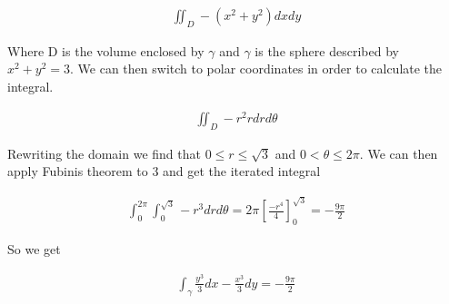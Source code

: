 \documentclass[a4paper]{article}
\begin{document}
\begin{align}
    \iint_{D} -(x^2 + y^2) dxdy
\end{align}

Where D is the volume enclosed by $\gamma$ and $\gamma$ is the sphere described by $x^2 + y^2 = 3$. We can then switch to polar coordinates in order to calculate the integral.

\begin{align}
    \iint_{D} -r^2 rdrd\theta
\end{align}

Rewriting the domain we find that $0\leq r \leq \sqrt{3}$ and $0 < \theta \leq 2\pi$. We can then apply Fubinis theorem to 3 and get the iterated integral

\begin{align}
    \int_{0}^{2\pi} \int_{0}^{\sqrt{3}} -r^3 dr d\theta = 2\pi \left [ \frac{-r^4}{4} \right ]_{0}^{\sqrt{3}} = -\frac{9\pi}{2}
\end{align}

So we get

\begin{align}
    \int_{\gamma} \frac{y^3}{3}dx  - \frac{x^3}{3}dy = -\frac{9\pi}{2}
\end{align}
\end{document}
